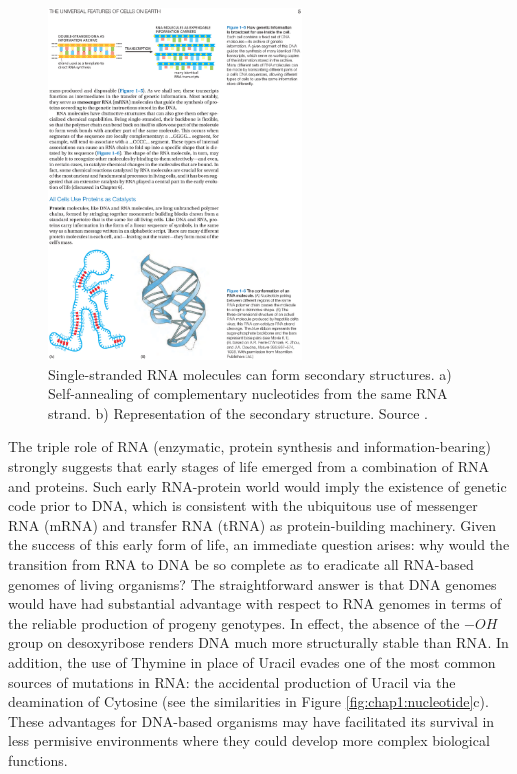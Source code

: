 \begin{figure}[h]
	\begin{minipage}[b]{\linewidth}
	  \centering
	  \includegraphics*[width=0.6\textwidth]{figures/chap1_rna_enzyme_full}
	  \caption{Single-stranded RNA molecules can form secondary
       structures. a) Self-annealing of complementary nucleotides from
       the same RNA strand. b) Representation of the secondary
       structure. Source \cite{alberts}.}
	  \label{fig:chap1:rna_enzyme}
   \end{minipage}
\end{figure}

The triple role of RNA (enzymatic, protein synthesis and
information-bearing) strongly suggests that early stages of life
emerged from a combination of RNA and proteins. Such early RNA-protein
world would imply the existence of genetic code prior to DNA, which is
consistent with the ubiquitous use of messenger RNA (mRNA) and
transfer RNA (tRNA) as protein-building machinery. Given the success
of this early form of life, an immediate question arises: why would
the transition from RNA to DNA be so complete as to eradicate all
RNA-based genomes of living organisms? The straightforward answer is
that DNA genomes would have had substantial advantage with respect to
RNA genomes in terms of the
reliable production of progeny genotypes. In effect, the absence of
the $-OH$ group on desoxyribose renders DNA much more structurally
stable than RNA. In addition, the use of Thymine in place of Uracil
evades one of the most common sources of mutations in RNA: the accidental
production of Uracil via the deamination of Cytosine (see the
similarities in Figure \ref{fig:chap1:nucleotide}c). These advantages
for DNA-based organisms may have facilitated its survival in less permisive
environments where they could develop more complex biological functions.

